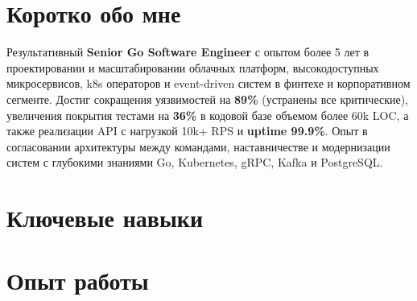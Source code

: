 \documentclass[10pt,a4paper,sans]{moderncv}
\begin{document}
\makecvtitle
\setlength{\hintscolumnwidth}{2.2cm}
\renewcommand{\subsectionfont}{\normalsize\bfseries}
\setlength{\parskip}{0.2em}
\setlength{\parindent}{0pt}

\section{Коротко обо мне}
Результативный \textbf{Senior Go Software Engineer} с опытом более 5 лет в проектировании и масштабировании облачных платформ, высокодоступных микросервисов, k8s операторов и event-driven систем в финтехе и корпоративном сегменте. Достиг сокращения уязвимостей на \textbf{89\%} (устранены все критические), увеличения покрытия тестами на \textbf{36\%} в кодовой базе объемом более 60k LOC, а также реализации API с нагрузкой 10k+ RPS и \textbf{uptime 99.9\%}. Опыт в согласовании архитектуры между командами, наставничестве и модернизации систем с глубокими знаниями Go, Kubernetes, gRPC, Kafka и PostgreSQL.

\section{Ключевые навыки}

\section{Опыт работы}
\end{document}
